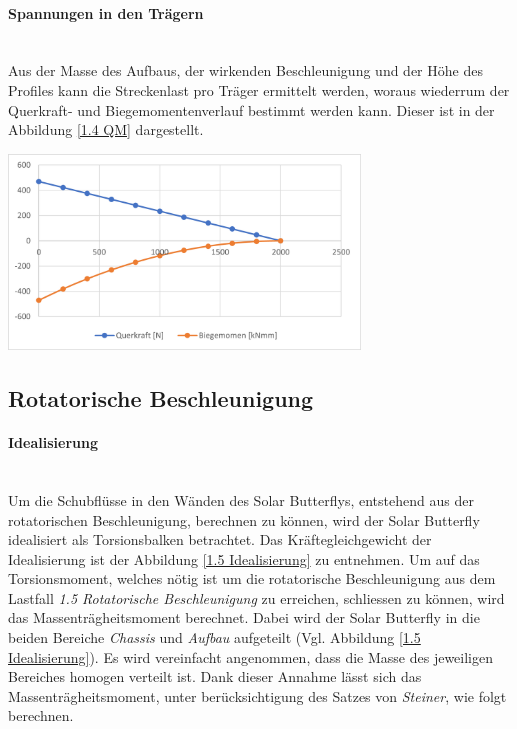   \paragraph{Spannungen in den Trägern}\mbox{}\\
  Aus der Masse des Aufbaus, der wirkenden Beschleunigung und der Höhe des Profiles kann die Streckenlast pro Träger ermittelt werden, woraus wiederrum der Querkraft- und Biegemomentenverlauf bestimmt werden kann. Dieser ist in der Abbildung \ref{1.4 QM} dargestellt.

  \begin{center}
    \includegraphics[width=0.7\textwidth]{04_Figures/1.4 QM.png}
    \label{1.4 QM}
  \end{center}




\subsection{Rotatorische Beschleunigung}
\paragraph{Idealisierung}\mbox{}\\
Um die Schubflüsse in den Wänden des Solar Butterflys, entstehend aus der rotatorischen Beschleunigung, berechnen zu können, wird der Solar Butterfly idealisiert als Torsionsbalken betrachtet. Das Kräftegleichgewicht der Idealisierung ist der Abbildung \ref{1.5 Idealisierung} zu entnehmen. Um auf das Torsionsmoment, welches nötig ist um die rotatorische Beschleunigung aus dem Lastfall \emph{1.5 Rotatorische Beschleunigung} zu erreichen, schliessen zu können, wird das Massenträgheitsmoment berechnet. Dabei wird der Solar Butterfly in die beiden Bereiche \emph{Chassis} und \emph{Aufbau} aufgeteilt (Vgl. Abbildung \ref{1.5 Idealisierung}).  Es wird vereinfacht angenommen, dass die Masse des jeweiligen Bereiches homogen verteilt ist. Dank dieser Annahme lässt sich das Massenträgheitsmoment, unter berücksichtigung des Satzes von \emph{Steiner}, wie folgt berechnen.

